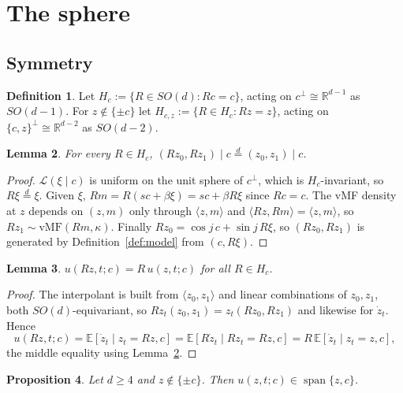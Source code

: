 \documentclass[11pt]{article}
\newtheorem{lemma}{Lemma}[section]
\newtheorem{proposition}[lemma]{Proposition}
\theoremstyle{definition}
\newtheorem{definition}[lemma]{Definition}
\theoremstyle{remark}
\DeclareMathOperator{\spn}{span}
\newcommand{\R}{\mathbb{R}}
\newcommand{\E}{\mathbb{E}}
\newcommand{\law}{\mathcal{L}}
\begin{document}
\section{The sphere}\label{sec:sphere}

\subsection{Symmetry}

\begin{definition}\label{def:stab}
Let $H_c:=\{R\in SO(d):Rc=c\}$, acting on $c^{\perp}\cong\R^{d-1}$ as $SO(d-1)$. For
$z\notin\{\pm c\}$ let $H_{c,z}:=\{R\in H_c:Rz=z\}$, acting on $\{c,z\}^{\perp}\cong\R^{d-2}$ as
$SO(d-2)$.
\end{definition}

\begin{lemma}\label{lem:invlaw}
For every $R\in H_c$, $(Rz_0,Rz_1)\mid c\overset{d}{=}(z_0,z_1)\mid c$.
\end{lemma}

\begin{proof}
$\law(\xi\mid c)$ is uniform on the unit sphere of $c^{\perp}$, which is $H_c$-invariant, so
$R\xi\overset{d}{=}\xi$. Given $\xi$, $Rm=R(sc+\beta\xi)=sc+\beta R\xi$ since $Rc=c$. The vMF
density at $z$ depends on $(z,m)$ only through $\langle z,m\rangle$ and
$\langle Rz,Rm\rangle=\langle z,m\rangle$, so $Rz_1\sim\mathrm{vMF}(Rm,\kappa)$. Finally
$Rz_0=\cos j\,c+\sin j\,R\xi$, so $(Rz_0,Rz_1)$ is generated by Definition~\ref{def:model} from
$(c,R\xi)$.
\end{proof}

\begin{lemma}\label{lem:equiv}
$u(Rz,t;c)=R\,u(z,t;c)$ for all $R\in H_c$.
\end{lemma}

\begin{proof}
The interpolant is built from $\langle z_0,z_1\rangle$ and linear combinations of $z_0,z_1$, both
$SO(d)$-equivariant, so $Rz_t(z_0,z_1)=z_t(Rz_0,Rz_1)$ and likewise for $\dot z_t$. Hence
\[
u(Rz,t;c)=\E[\dot z_t\mid z_t=Rz,c]=\E[R\dot z_t\mid Rz_t=Rz,c]=R\,\E[\dot z_t\mid z_t=z,c],
\]
the middle equality using Lemma~\ref{lem:invlaw}.
\end{proof}

\begin{proposition}\label{prop:2plane}
Let $d\geq4$ and $z\notin\{\pm c\}$. Then $u(z,t;c)\in\spn\{z,c\}$.
\end{proposition}
\end{document}
